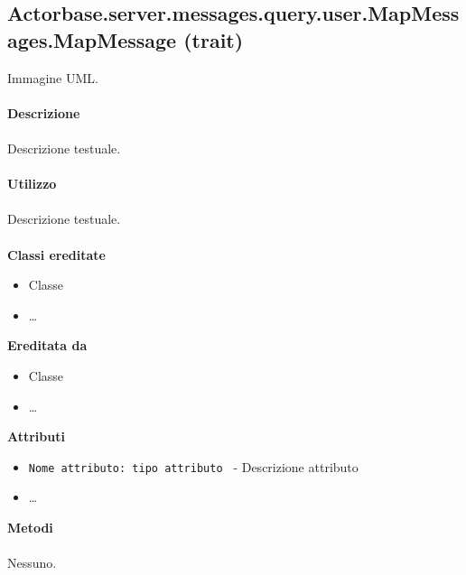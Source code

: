 \documentclass[a4paper]{article}
\begin{document}
	\subsection{Actorbase.server.messages.query.user.MapMessages.MapMessage (trait)}
		Immagine UML.
		\\ \\
		\textbf{Descrizione}
			\\ \\
			Descrizione testuale.
			\\ \\
		\textbf{Utilizzo}
			\\ \\
			Descrizione testuale.
			\\ \\
		\textbf{Classi ereditate}
			\begin{itemize}
				\item Classe
				\item \dots
			\end{itemize}
		\textbf{Ereditata da}
			\begin{itemize}
				\item Classe
				\item \dots
			\end{itemize}
		\textbf{Attributi}
			\begin{itemize}
				\item \texttt{Nome attributo: tipo attributo } - Descrizione attributo
				\item \dots
			\end{itemize}
		\textbf{Metodi}
			\\ \\
			Nessuno.	
			
\end{document}
